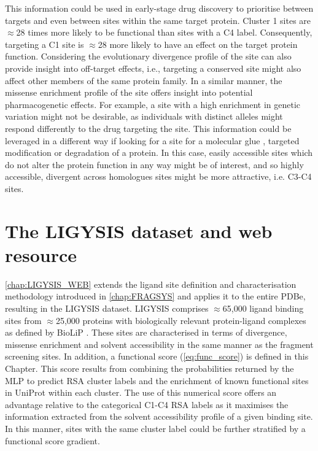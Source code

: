 This information could be used in early-stage drug discovery to prioritise between targets and even between sites within the same target protein. Cluster 1 sites are $\approx$28 times more likely to be functional than sites with a C4 label. Consequently, targeting a C1 site is $\approx$28 more likely to have an effect on the target protein function. Considering the evolutionary divergence profile of the site can also provide insight into off-target effects, i.e., targeting a conserved site might also affect other members of the same protein family. In a similar manner, the missense enrichment profile of the site offers insight into potential pharmacogenetic effects. For example, a site with a high enrichment in genetic variation might not be desirable, as individuals with distinct alleles might respond differently to the drug targeting the site. This information could be leveraged in a different way if looking for a site for a molecular glue \cite{SCHREIBER_2021_GLUES}, targeted modification \cite{BREWER_2024_ATLAS, BREWER_2024_SMAD3, ZHAO_2024_TFEB} or degradation \cite{ZENGERLE_2015_BRD4, GADD_2017_PROTAC} of a protein. In this case, easily accessible sites which do not alter the protein function in any way might be of interest, and so highly accessible, divergent across homologues sites might be more attractive, i.e. C3-C4 sites.

\section{The LIGYSIS dataset and web resource}

\autoref{chap:LIGYSIS_WEB} extends the ligand site definition and characterisation methodology introduced in \autoref{chap:FRAGSYS} and applies it to the entire PDBe, resulting in the LIGYSIS dataset. LIGYSIS comprises $\approx$65,000 ligand binding sites from $\approx$25,000 proteins with biologically relevant protein-ligand complexes as defined by BioLiP \cite{YANG_2013_BIOLIP}. These sites are characterised in terms of divergence, missense enrichment and solvent accessibility in the same manner as the fragment screening sites. In addition, a functional score (\autoref{eq:func_score}) is defined in this Chapter. This score results from combining the probabilities returned by the MLP to predict RSA cluster labels and the enrichment of known functional sites in UniProt \cite{NIGHTINGALE_2017_API} within each cluster. The use of this numerical score offers an advantage relative to the categorical C1-C4 RSA labels as it maximises the information extracted from the solvent accessibility profile of a given binding site. In this manner, sites with the same cluster label could be further stratified by a functional score gradient.


